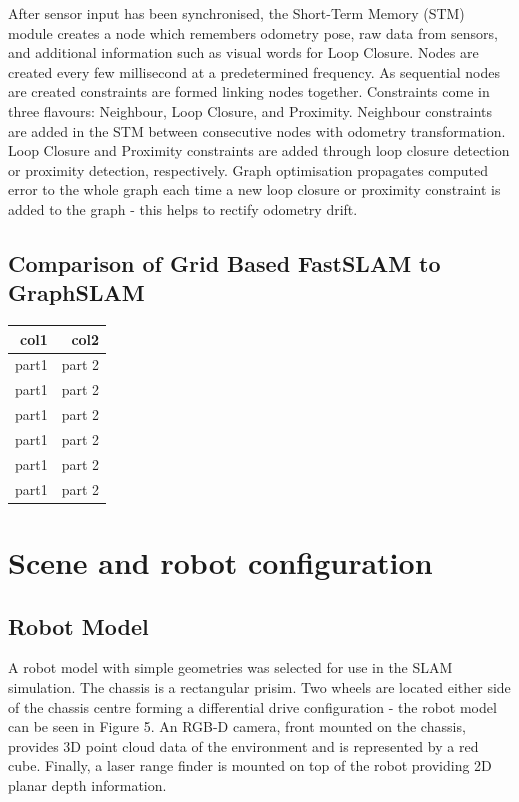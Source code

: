 \documentclass[a4paper]{article}
\begin{document}
After sensor input has been synchronised, the Short-Term Memory (STM) module creates a node which remembers odometry pose, raw data from sensors, and additional information such as visual words for Loop Closure. Nodes are created every few millisecond at a predetermined frequency. As sequential nodes are created constraints are formed linking nodes together. Constraints come in three flavours: Neighbour, Loop Closure, and Proximity. Neighbour constraints are added in the STM between consecutive nodes with odometry transformation. Loop Closure and Proximity constraints are added through loop closure detection or proximity detection, respectively. Graph optimisation propagates computed error to the whole graph each time a new loop closure or proximity constraint is added to the graph - this helps to rectify odometry drift.

\newpage


\subsection{Comparison of Grid Based FastSLAM to GraphSLAM}
\lipsum[30]
\begin{table}[h]
\centering
\begin{tabular}{rr}
\toprule
col1 & col2\\
\midrule
part1 & part 2\\
part1 & part 2\\
part1 & part 2\\
part1 & part 2\\
part1 & part 2\\
part1 & part 2\\
\bottomrule
\end{tabular}
\end{table}


\section{Scene and robot configuration}
\subsection{Robot Model}
A robot model with simple geometries was selected for use in the SLAM simulation. The chassis is a rectangular prisim. Two wheels are located either side of the chassis centre forming a differential drive configuration - the robot model can be seen in Figure 5. An RGB-D camera, front mounted on the chassis, provides 3D point cloud data of the environment and is represented by a red cube. Finally, a laser range finder is mounted on top of the robot providing 2D planar depth information.\\
\end{document}
